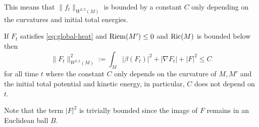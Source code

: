 This means that \(\|f_t\|_{W^{2,2}(M)}\) is bounded by a constant \(C\) only depending
on the curvatures and initial total energies.


\begin{corollary}[Boundedness in \( W^{2,2}(M) \)]
\label{cor:bound-2-2}
If \(F_t\) satisfies \eqref{eq:global-heat} and \(\mathop{\rm Riem}\nolimits(M')\leq 0\) and \(\mathop{\rm Ric}\nolimits(M)\)
is bounded below then
\[
\|F_t\|^2_{W^{2,2}(M)} := \int_M | \beta(F_t)|^2 + |\nabla F_t| +|F|^2 \leq C
\]
for all time \(t\) where the constant \(C\) only depends on the curvature of \(M, M'\) and the initial total potential and kinetic energy, in particular, \(C\) does not depend on \(t\).
\end{corollary}

Note that the term \(|F|^2\) is trivially bounded since the image of \(F\) remains in
an Euclidean ball \(B\).

